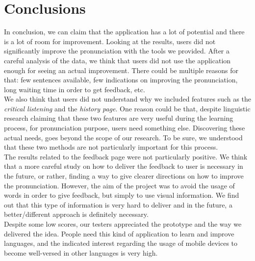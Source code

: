 
\chapter{Conclusions}
\label{chap:Conclusions}

In conclusion, we can claim that the application has a lot of potential and there is a lot of room for improvement. Looking at the results,  users did not significantly improve the pronunciation with the tools we provided. After a careful analysis of the data, we think that users did not use the application enough for seeing an actual improvement. There could be multiple reasons for that: few sentences available, few indications on improving the pronunciation, long waiting time in order to get feedback, etc. \\
\noindent We also think that users did not understand why we included features such as the \textit{critical listening} and the \textit{history page}. One reason could be that, despite linguistic research claiming that these two features are very useful during the learning process, for pronunciation purpose, users need something else. Discovering these actual needs, goes beyond the scope of our research. To be sure, we understood that these two methods are not particularly important for this process. \\
\noindent The results related to the feedback page were not particularly positive. We think that a more careful study on how to deliver the feedback to user is necessary in the future, or rather, finding a way to give clearer directions on how to improve the pronunciation. However, the aim of the project was to avoid the usage of words in order to give feedback, but simply to use visual information. We find out that this type of information is very hard to deliver and in the future, a better/different approach is definitely necessary. \\

\noindent Despite some low scores, our testers appreciated the prototype and the way we delivered the idea. People need this kind of application to learn and improve languages, and the indicated interest regarding the usage of mobile devices to become well-versed in other languages is very high.
